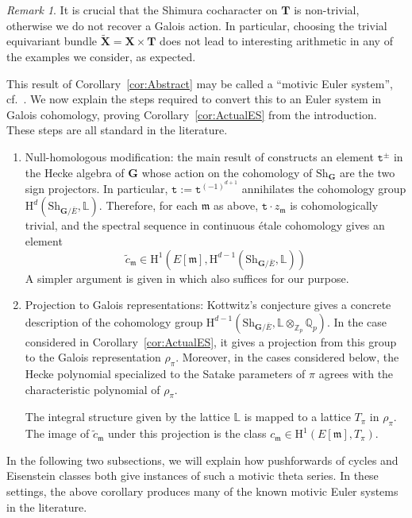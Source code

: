 \documentclass{amsart}
\theoremstyle{definition}
\theoremstyle{remark}
\newtheorem{remark}[theorem]{Remark}
\newcommand{\1}{\mathbf{1}}
\newcommand{\h}{\mathrm{H}}
\newcommand{\m}{\mathfrak{m}}
\newcommand{\mb}[1]{\mathbf{#1}}
\newcommand{\Q}{\mathbb{Q}}
\newcommand{\Z}{\mathbb{Z}}
\theoremstyle{definition}
\newcommand{\bG}{\mathbf{G}}
\newcommand{\Sh}{\mathrm{Sh}}
\begin{document}
\begin{remark}
  It is crucial that the Shimura cocharacter on $\mb{T}$ is non-trivial, otherwise we do not recover a Galois action. In particular, choosing the trivial equivariant bundle $\widetilde{\mb{X}}=\mb{X}\times\mb{T}$ does not lead to interesting arithmetic in any of the examples we consider, as expected.
\end{remark}

This result of Corollary~\ref{cor:Abstract} may be called a ``motivic Euler system'', cf.~\cite[\S 9.4]{LSZ-U3}. We now explain the steps required to convert this to an Euler system in Galois cohomology, proving Corollary~\ref{cor:ActualES} from the introduction. These steps are all standard in the literature.
\begin{enumerate}
  \item Null-homologous modification: the main result of \cite{MorelSuh} constructs an element $\mathtt{t}^{\pm}$ in the Hecke algebra of $\mb{G}$ whose action on the cohomology of $\Sh_{\bG}$ are the two sign projectors. In particular, $\mathtt{t}:=\mathtt{t}^{(-1)^{d+1}}$ annihilates the cohomology group $\h^d(\Sh_{\bG/\bar{E}},\mathbb{L})$. Therefore, for each $\m$ as above, $\mathtt{t}\cdot z_\m$ is cohomologically trivial, and the spectral sequence in continuous \'etale cohomology \cite[Remark 3.5(b)]{JannsenContEt} gives an element
  \[
    \tilde{c}_\m\in\h^1(E[\m],\h^{d-1}(\Sh_{\bG/\bar{E}},\mathbb{L}))
  \]
  A simpler argument is given in \cite[Proposition 6.9(1)]{LL2021} which also suffices for our purpose.
  \item Projection to Galois representations: Kottwitz's conjecture gives a concrete description of the cohomology group $\h^{d-1}(\Sh_{\bG/\bar{E}},\mathbb{L}\otimes_{\Z_p}\Q_p)$. In the case considered in Corollary~\ref{cor:ActualES}, it gives a projection from this group to the Galois representation $\rho_\pi$. Moreover, in the cases considered below, the Hecke polynomial specialized to the Satake parameters of $\pi$ agrees with the characteristic polynomial of $\rho_\pi$.
  
  The integral structure given by the lattice $\mathbb{L}$ is mapped to a lattice $T_\pi$ in $\rho_\pi$. The image of $\tilde{c}_\m$ under this projection is the class $c_\m\in\h^1(E[\m],T_\pi)$.
\end{enumerate}

In the following two subsections, we will explain how pushforwards of cycles and Eisenstein classes both give instances of such a motivic theta series. In these settings, the above corollary produces many of the known motivic Euler systems in the literature.
\end{document}
